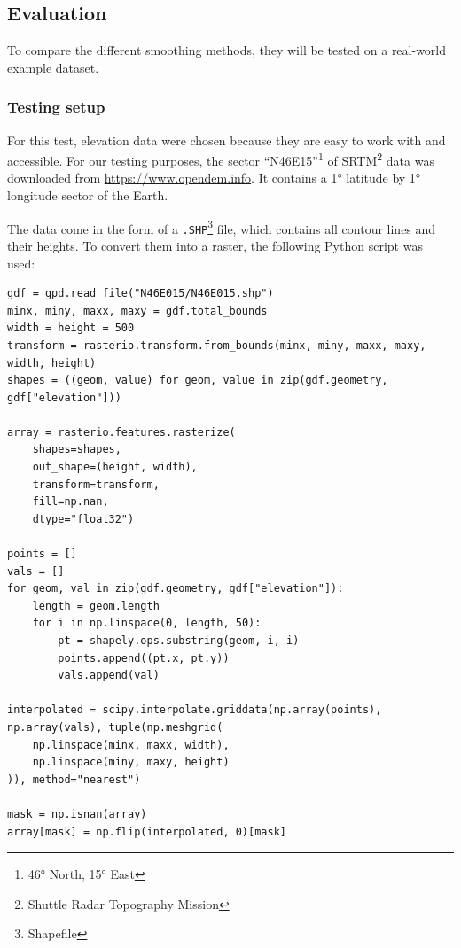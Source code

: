 \subsection{Evaluation}\label{subsec:evaluation}
To compare the different smoothing methods, they will be tested on a real-world example dataset.

\subsubsection{Testing setup}
For this test, elevation data were chosen because they are easy to work with and accessible. For our testing purposes, the sector ``N46E15''\footnote{46° North, 15° East} of SRTM\footnote{Shuttle Radar Topography Mission} data was downloaded from \url{https://www.opendem.info}. It contains a 1° latitude by 1° longitude sector of the Earth.

The data come in the form of a \verb|.SHP|\footnote{Shapefile} file, which contains all contour lines and their heights. To convert them into a raster, the following Python script was used:
\begin{lstlisting}[language={[AS]Python},caption=Importing a raster from a Shapefile]
gdf = gpd.read_file("N46E015/N46E015.shp")
minx, miny, maxx, maxy = gdf.total_bounds
width = height = 500
transform = rasterio.transform.from_bounds(minx, miny, maxx, maxy, width, height)
shapes = ((geom, value) for geom, value in zip(gdf.geometry, gdf["elevation"]))

array = rasterio.features.rasterize(
    shapes=shapes,
    out_shape=(height, width),
    transform=transform,
    fill=np.nan,
    dtype="float32")

points = []
vals = []
for geom, val in zip(gdf.geometry, gdf["elevation"]):
    length = geom.length
    for i in np.linspace(0, length, 50):
        pt = shapely.ops.substring(geom, i, i)
        points.append((pt.x, pt.y))
        vals.append(val)

interpolated = scipy.interpolate.griddata(np.array(points), np.array(vals), tuple(np.meshgrid(
    np.linspace(minx, maxx, width),
    np.linspace(miny, maxy, height)
)), method="nearest")

mask = np.isnan(array)
array[mask] = np.flip(interpolated, 0)[mask]
\end{lstlisting}

